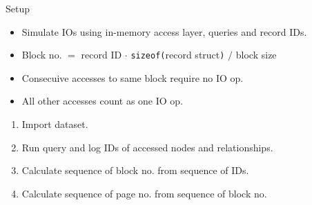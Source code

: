 \documentclass[rgb]{beamer}
\begin{document}
\begin{frame}[allowframebreaks]{Setup}
            \begin{itemize}
            \item Simulate IOs using in-memory access layer, queries and record IDs. \\ [1em]
            \item Block no. $=$ record ID $\cdot$ \texttt{sizeof(}record struct\texttt{)} $/$ block size \\  [1em]
            \item Consecuive accesses to same block require no IO op. \\ [1em]
            \item All other accesses count as one IO op. \\ [2em]
            \end{itemize}
            \begin{enumerate}
                \item Import dataset.
                \item Run query and log IDs of accessed nodes and relationships.
                \item Calculate sequence of block no. from sequence of IDs.
                \item Calculate sequence of page no. from sequence of block no.
               \end{enumerate}
        \end{frame}
        
\end{document}
